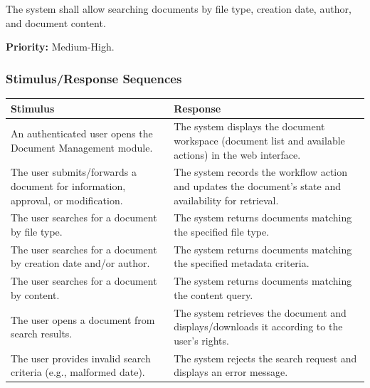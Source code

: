 \documentclass[11pt, a4paper]{article}
\begin{document}
The system shall allow searching documents by file type, creation date, author, and document content.

\textbf{Priority:} Medium-High.

\subsubsection{Stimulus/Response Sequences}
\begin{table}[H]
\begin{tabularx}{\textwidth}{>{\raggedright\arraybackslash}p{6cm} >{\raggedright\arraybackslash}X}
\toprule
\textbf{Stimulus} & \textbf{Response} \\
\midrule
An authenticated user opens the Document Management module. & The system displays the document workspace (document list and available actions) in the web interface. \\
\midrule
The user submits/forwards a document for information, approval, or modification. & The system records the workflow action and updates the document's state and availability for retrieval. \\
\midrule
The user searches for a document by file type. & The system returns documents matching the specified file type. \\
\midrule
The user searches for a document by creation date and/or author. & The system returns documents matching the specified metadata criteria. \\
\midrule
The user searches for a document by content. & The system returns documents matching the content query. \\
\midrule
The user opens a document from search results. & The system retrieves the document and displays/downloads it according to the user's rights. \\
\midrule
The user provides invalid search criteria (e.g., malformed date). & The system rejects the search request and displays an error message. \\
\bottomrule
\end{tabularx}
\end{table}
\end{document}
